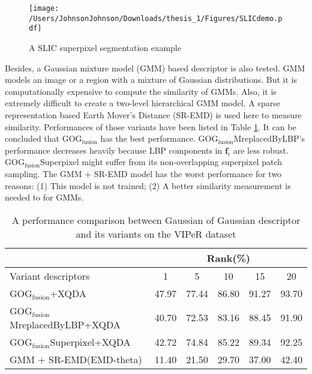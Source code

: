 \begin{figure}[H]
\begin{raggedleft}
\texttt{[image: /Users/JohnsonJohnson/Downloads/thesis\_1/Figures/SLICdemo.pdf]}
\vspace{-3em}
\caption{A SLIC superpixel segmentation example}
\label{SLICdemoCUHK}
\end{raggedleft}
\end{figure}

Besides, a Gaussian mixture model (GMM) based descriptor is also tested. GMM models an image or a region with a mixture of Gaussian distributions. But it is computationally expensive to compute the similarity of GMMs. Also, it is extremely difficult to create a two-level hierarchical GMM model. A sparse representation based Earth Mover's Distance (SR-EMD) \cite{novelEMD} is used here to measure similarity. Performances of those variants have been listed in Table \ref{VariantsComparison}. It can be concluded that GOG$_\text{fusion}$ has the best performance. GOG$_\text{fusion}$MreplacedByLBP's performance decreases heavily because LBP components in $\bm{f}_i$ are less robust. GOG$_\text{fusion}$Superpixel might suffer from its non-overlapping superpixel patch sampling. The GMM + SR-EMD model has the worst performance for two reasons: (1) This model is not trained; (2) A better similarity measurement is needed to for GMMs.
\begin{table}[H]
\centering
\caption{A performance comparison between Gaussian of Gaussian descriptor and its variants on the VIPeR dataset}
\label{VariantsComparison}
\begin{tabular}{|l|c|c|c|c|c|}
\hline
& \multicolumn{5}{|c|}{Rank(\%)}\\
\hline
Variant descriptors & 1&5&10&15&20\\
\hline
GOG$_\text{fusion}$+XQDA & 47.97& 77.44&86.80 &91.27 &93.70 \\ 
\hline
GOG$_\text{fusion}$MreplacedByLBP+XQDA & 40.70&72.53 &83.16 &88.45 &91.90 \\ %
\hline
GOG$_\text{fusion}$Superpixel+XQDA &42.72 &74.84 & 85.22&89.34& 92.25\\ %
\hline
GMM + SR-EMD(EMD-theta) &11.40 &21.50 &29.70 &37.00 &42.40 \\ %
\hline
\end{tabular}
\end{table}



